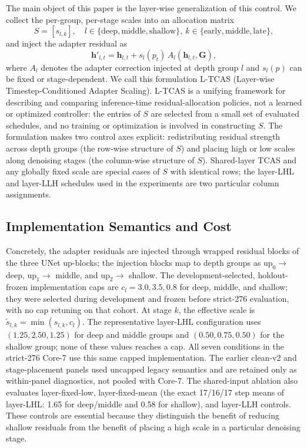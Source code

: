 \documentclass[times,twocolumn,final]{elsarticle}
\begin{document}
The main object of this paper is the layer-wise generalization of this control. We collect the per-group, per-stage scales into an allocation matrix
\begin{equation}
S=[s_{l,k}],\quad l\in\{\text{deep},\text{middle},\text{shallow}\},\ k\in\{\text{early},\text{middle},\text{late}\},
\label{eq:allocation}
\end{equation}
and inject the adapter residual as
\begin{equation}
\mathbf{h}'_{l,t}=\mathbf{h}_{l,t}+s_{l}(p_t)\,A_l(\mathbf{h}_{l,t},\mathbf{G}),
\label{eq:layer_tcas}
\end{equation}
where $A_l$ denotes the adapter correction injected at depth group $l$ and $s_l(p)$ can be fixed or stage-dependent. We call this formulation L-TCAS (Layer-wise Timestep-Conditioned Adapter Scaling). L-TCAS is a unifying framework for describing and comparing inference-time residual-allocation policies, not a learned or optimized controller: the entries of $S$ are selected from a small set of evaluated schedules, and no training or optimization is involved in constructing $S$. The formulation makes two control axes explicit: redistributing residual strength across depth groups (the row-wise structure of $S$) and placing high or low scales along denoising stages (the column-wise structure of $S$). Shared-layer TCAS and any globally fixed scale are special cases of $S$ with identical rows; the layer-LHL and layer-LLH schedules used in the experiments are two particular column assignments.

\subsection{Implementation Semantics and Cost}
\label{subsec:impl}

Concretely, the adapter residuals are injected through wrapped residual blocks of the three UNet up-blocks; the injection blocks map to depth groups as
$\mathrm{up}_0\to$ deep, $\mathrm{up}_1\to$ middle, and
$\mathrm{up}_2\to$ shallow. The development-selected, holdout-frozen
implementation caps are $c_l=3.0,3.5,0.8$ for deep, middle, and shallow;
they were selected during development and frozen before strict-276 evaluation, with no cap retuning on that
cohort. At stage $k$, the effective scale is
$\tilde{s}_{l,k}=\min(s_{l,k},c_l)$. The representative layer-LHL configuration uses
$(1.25,2.50,1.25)$ for deep and middle groups and $(0.50,0.75,0.50)$ for the
shallow group; none of these values reaches a cap. All seven conditions in
the strict-276 Core-7 use this same capped implementation. The earlier
clean-v2 and stage-placement panels used uncapped legacy semantics and are
retained only as within-panel diagnostics, not pooled with Core-7. The
shared-input ablation also evaluates
layer-fixed-low, layer-fixed-mean (the exact 17/16/17 step means of
layer-LHL: 1.65 for deep/middle and 0.58 for shallow), and layer-LLH
controls. These controls are essential because they distinguish the benefit
of reducing shallow residuals from the benefit of placing a high scale in a
particular denoising stage.
\end{document}
